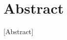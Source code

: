 \chapter*{Abstract}

[Abstract]

\begin{comment}
\begin{flushright}
{\makeatletter\itshape
    \@author \\
    Delft, January 2018
\makeatother}
\end{flushright}
\end{comment}
